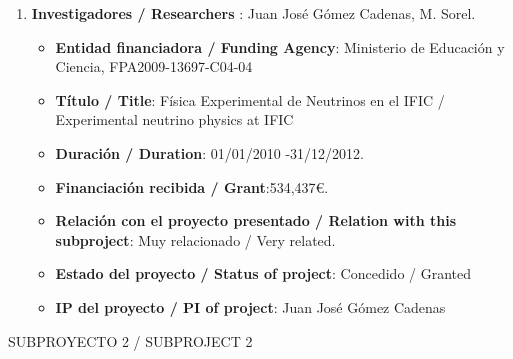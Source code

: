 \begin{enumerate}
\begin{itemize}
\item {\bf Título / Title}:  Coordination of NEXT Project.
\item {\bf Duración / Duration}: 01/01/2013 -31/12/2014. 
\item {\bf Financiación recibida / Grant}:256,000\euro. 
\item {\bf Relación con el proyecto presentado / Relation with this subproject}: Mismo tema / Same topic. 
\item {\bf Estado del proyecto / Status of project}: Concedido / Granted
\item {\bf IP del proyecto / PI of project}: Juan José Gómez Cadenas 
\end{itemize}
\item {\bf Investigadores / Researchers }: Juan José Gómez Cadenas, M. Sorel.
\begin{itemize}
\item {\bf Entidad financiadora / Funding Agency}:  Ministerio de Educaci\'on y Ciencia, FPA2009-13697-C04-04
\item {\bf Título / Title}:  Física Experimental de Neutrinos en el IFIC / Experimental neutrino physics at IFIC
\item {\bf Duración / Duration}: 01/01/2010 -31/12/2012. 
\item {\bf Financiación recibida / Grant}:534,437\euro. 
\item {\bf Relación con el proyecto presentado / Relation with this subproject}: Muy relacionado / Very related. 
\item {\bf Estado del proyecto / Status of project}: Concedido / Granted
\item {\bf IP del proyecto / PI of project}: Juan José Gómez Cadenas 
\end{itemize}
\end{enumerate}

{\sc SUBPROYECTO 2 / SUBPROJECT 2}

